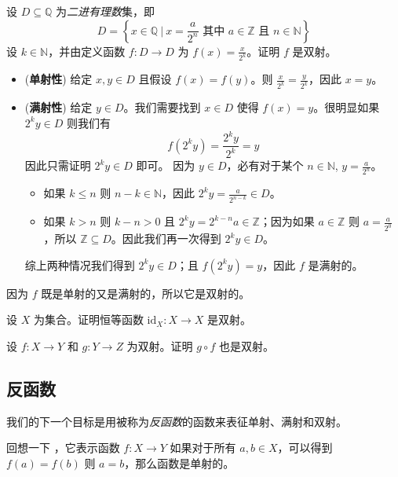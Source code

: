\begin{example}
\label{exDyadicRationalsBijection}
设 $D \subseteq \mathbb{Q}$ 为\textit{二进有理数}集，即
\[ D = \left\{ x \in \mathbb{Q} \ \bigg|\  x = \frac{a}{2^n} \text{ 其中 } a \in \mathbb{Z} \text{ 且 } n \in \mathbb{N} \right\} \]
设 $k \in \mathbb{N}$，并由定义函数 $f : D \to D$ 为 $f(x)=\frac{x}{2^k}$。证明 $f$ 是双射。
\begin{itemize}
\item (\textbf{单射性}) 给定 $x,y \in D$ 且假设 $f(x)=f(y)$。则 $\frac{x}{2^k}=\frac{y}{2^k}$，因此 $x=y$。
\item (\textbf{满射性}) 给定 $y \in D$。我们需要找到 $x \in D$ 使得 $f(x)=y$。很明显如果 $2^ky \in D$ 则我们有 \[ f(2^ky)=\frac{2^ky}{2^k}=y \]
因此只需证明 $2^ky \in D$ 即可。
因为 $y \in D$，必有对于某个 $n \in \mathbb{N}$, $y=\frac{a}{2^n}$。
\begin{itemize}
\item 如果 $k \le n$ 则 $n-k \in \mathbb{N}$，因此 $2^ky=\frac{a}{2^{n-k}} \in D$。
\item 如果 $k > n$ 则 $k-n>0$ 且 $2^ky = 2^{k-n}a \in \mathbb{Z}$；因为如果 $a \in \mathbb{Z}$ 则 $a=\frac{a}{2^0}$，所以 $\mathbb{Z} \subseteq D$。因此我们再一次得到 $2^ky \in D$。
\end{itemize}
综上两种情况我们得到 $2^ky \in D$；且 $f(2^ky)=y$，因此 $f$ 是满射的。
\end{itemize}
因为 $f$ 既是单射的又是满射的，所以它是双射的。
\end{example}

\begin{exercise}
\label{exIdentityBijection}
设 $X$ 为集合。证明恒等函数 $\mathrm{id}_X : X \to X$ 是双射。
\end{exercise}

\begin{exercise}
\label{exCompositeOfBijectionsIsBijection}
设 $f : X \to Y$ 和 $g : Y \to Z$ 为双射。证明 $g \circ f$ 也是双射。
\end{exercise}

\subsection*{反函数}

我们的下一个目标是用被称为\textit{反函数}的函数来表征单射、满射和双射。

回想一下 ，它表示函数 $f : X \to Y$ 如果对于所有 $a,b \in X$，可以得到 $f(a)=f(b)$ 则 $a=b$，那么函数是单射的。

